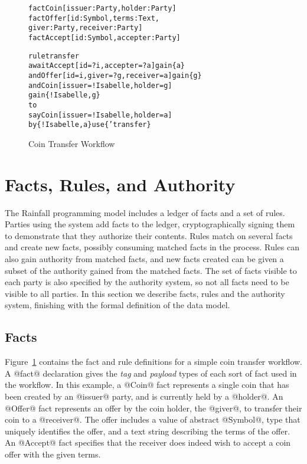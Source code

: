 
\clearpage{}

\begin{figure}
\begin{small}
\begin{alltt}
fact  Coin   [issuer: Party,  holder:   Party]
fact  Offer  [id:     Symbol, terms:    Text,
              giver:  Party,  receiver: Party ]
fact  Accept [id:     Symbol, accepter: Party]

rule  transfer
await Accept [id = ?i, accepter = ?a]            gain \{a\}
  and Offer  [id = i,  giver = ?g, receiver = a] gain \{g\}
  and Coin   [issuer = !Isabelle,  holder = g]
      gain \{!Isabelle,g\}
to
  say Coin   [issuer = !Isabelle,  holder = a]
   by \{!Isabelle,a\}  use \{'transfer\}
\end{alltt}
\end{small}
\caption{Coin Transfer Workflow}
\label{f:CoinTransfer}
\end{figure}


\section{Facts, Rules, and Authority}
\label{s:FactsWeights}
The Rainfall programming model includes a ledger of facts and a set of rules. Parties using the system add facts to the ledger, cryptographically signing them to demonstrate that they authorize their contents. Rules match on several facts and create new facts, possibly consuming matched facts in the process. Rules can also gain authority from matched facts, and new facts created can be given a subset of the authority gained from the matched facts. The set of facts visible to each party is also specified by the authority system, so not all facts need to be visible to all parties. In this section we describe facts, rules and the authority system, finishing with the formal definition of the data model.


\subsection{Facts}
\label{s:Facts}
Figure~\ref{f:CoinTransfer} contains the fact and rule definitions for a simple coin transfer workflow. A @fact@ declaration gives the \emph{tag} and \emph{payload} types of each sort of fact used in the workflow. In this example, a @Coin@ fact represents a single coin that has been created by an @issuer@ party, and is currently held by a @holder@. An @Offer@ fact represents an offer by the coin holder, the @giver@, to transfer their coin to a @receiver@. The offer includes a value of abstract @Symbol@, type that uniquely identifies the offer, and a text string describing the terms of the offer. An @Accept@ fact specifies that the receiver does indeed wish to accept a coin offer with the given terms.

